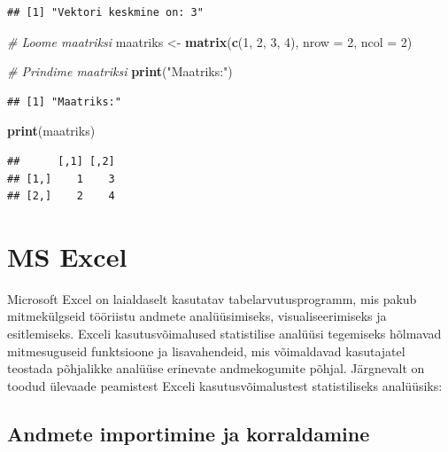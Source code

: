 \documentclass[
]{book}
\newenvironment{Shaded}{\begin{snugshade}}{\end{snugshade}}
\newcommand{\AttributeTok}[1]{\textcolor[rgb]{0.13,0.29,0.53}{#1}}
\newcommand{\CommentTok}[1]{\textcolor[rgb]{0.56,0.35,0.01}{\textit{#1}}}
\newcommand{\DecValTok}[1]{\textcolor[rgb]{0.00,0.00,0.81}{#1}}
\newcommand{\FunctionTok}[1]{\textcolor[rgb]{0.13,0.29,0.53}{\textbf{#1}}}
\newcommand{\NormalTok}[1]{#1}
\newcommand{\OtherTok}[1]{\textcolor[rgb]{0.56,0.35,0.01}{#1}}
\newcommand{\StringTok}[1]{\textcolor[rgb]{0.31,0.60,0.02}{#1}}
\renewenvironment{Shaded} {\begin{snugshade}\footnotesize} {\end{snugshade}}
\begin{document}
\begin{verbatim}
## [1] "Vektori keskmine on: 3"
\end{verbatim}

\begin{Shaded}
\begin{Highlighting}[]
\CommentTok{\# Loome maatriksi}
\NormalTok{maatriks }\OtherTok{\textless{}{-}} \FunctionTok{matrix}\NormalTok{(}\FunctionTok{c}\NormalTok{(}\DecValTok{1}\NormalTok{, }\DecValTok{2}\NormalTok{, }\DecValTok{3}\NormalTok{, }\DecValTok{4}\NormalTok{), }\AttributeTok{nrow =} \DecValTok{2}\NormalTok{, }\AttributeTok{ncol =} \DecValTok{2}\NormalTok{)}

\CommentTok{\# Prindime maatriksi}
\FunctionTok{print}\NormalTok{(}\StringTok{"Maatriks:"}\NormalTok{)}
\end{Highlighting}
\end{Shaded}

\begin{verbatim}
## [1] "Maatriks:"
\end{verbatim}

\begin{Shaded}
\begin{Highlighting}[]
\FunctionTok{print}\NormalTok{(maatriks)}
\end{Highlighting}
\end{Shaded}

\begin{verbatim}
##      [,1] [,2]
## [1,]    1    3
## [2,]    2    4
\end{verbatim}

\section{MS Excel}\label{ms-excel}

Microsoft Excel on laialdaselt kasutatav tabelarvutusprogramm, mis pakub mitmekülgseid tööriistu andmete analüüsimiseks, visualiseerimiseks ja esitlemiseks. Exceli kasutusvõimalused statistilise analüüsi tegemiseks hõlmavad mitmesuguseid funktsioone ja lisavahendeid, mis võimaldavad kasutajatel teostada põhjalikke analüüse erinevate andmekogumite põhjal. Järgnevalt on toodud ülevaade peamistest Exceli kasutusvõimalustest statistiliseks analüüsiks:

\subsection{Andmete importimine ja korraldamine}\label{andmete-importimine-ja-korraldamine}
\end{document}
